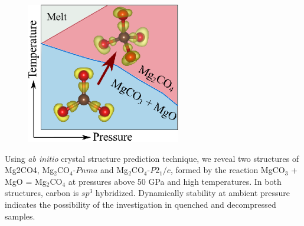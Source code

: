 \documentclass[a4paperm]{article}
\begin{document}
\begin{figure}[H]
\includegraphics[width=0.6\textwidth]{toc_mg2co4} \centering

\end{figure}

Using {\it ab initio} crystal structure prediction technique, we reveal two structures of Mg2CO4,  Mg$_2$CO$_4$-$Pnma$ and  Mg$_2$CO$_4$-$P2_1/c$, formed by the reaction MgCO$_3$ + MgO = Mg$_2$CO$_4$ at pressures above 50 GPa and high temperatures.
In both structures, carbon is $sp^3$ hybridized.
Dynamically stability at ambient pressure indicates the possibility of the investigation in quenched and decompressed samples. 
\end{document}
